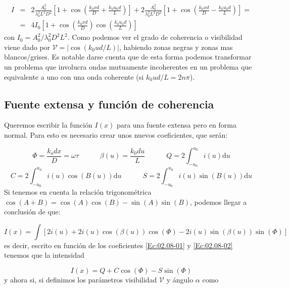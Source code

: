 \documentclass[12pt,a4paper]{book}
\numberwithin{equation}{section}
\numberwithin{figure}{section}
\newcommand{\tquad}{\quad \quad \quad}
\newcommand{\parentesis}[1]{\left( #1  \right)}
\newcommand{\ccorchetes}[1]{\left[ #1  \right]}
\newcommand{\D}{\mathrm{d}}
\newcommand{\1}{_{(1)}}
\newcommand{\2}{_{(2)}}
\theoremstyle{definition}
\begin{document}
\begin{eqnarray*}
 I  & = & 2 \frac{A_0^2}{\lambda_0^2 L^2 D^2} \ccorchetes{ 1 + \cos \parentesis{\frac{k_0 xd}{D} + \frac{k_0 u_0 d}{L}}} + 2 \frac{A_0^2}{\lambda_0^2 L^2 D^2} \ccorchetes{ 1 + \cos \parentesis{\frac{k_0 xd}{D} - \frac{k_0 u_0 d}{L}}} =  \\
 & = & 4 I_0 \ccorchetes{ 1 + \cos \parentesis{\frac{k_0 xd}{D} } \cos \parentesis{\frac{k_0 u_0 d}{L}}} 
\end{eqnarray*}
con $I_0 = A_0^2 / \lambda_0^2 D^2 L^2$. Como podemos ver el grado de coherencia o visibilidad viene dado por $\mathcal{V} = | \cos (k_0 u d / L ) |$, habiendo zonas negras y zonas mas blancos/grises. Es notable darse cuenta que de esta forma podemos transformar un problema que involucra ondas mutuamente incoherentes en un problema que equivalente a uno con una onda coherente (si $k_0 u d / L = 2n\pi$).



\hrulefill


\subsection{Fuente extensa y función de coherencia}

Queremos escribir la función $I(x)$ para una fuente extensa pero en forma normal. Para esto es necesario crear unos nuevos coeficientes, que serán:

\begin{equation}
\Phi = \frac{k_o d x }{D} = \omega \tau \tquad \beta (u) = \frac{k_0 d u }{L} \tquad Q = 2 \int_{-u_0}^{u_0} i(u) \D u  \label{Ec:02.08-01}
\end{equation}
\begin{equation}
C = 2 \int_{-u_0}^{u_0} i(u) \cos(B(u)) \D u \tquad S = 2 \int_{-u_0}^{u_0} i(u) \sin (B(u)) \D u \label{Ec:02.08-02}
\end{equation}
Si tenemos en cuenta la relación trigonométrica $\cos (A+B) = \cos (A)  \cos (B) - \sin (A) \sin (B)$, podemos llegar a conclusión de que:

$$ I(x) = \int \ccorchetes{ 2 i (u) + 2 i(u) \cos \parentesis{\beta(u)} \cos \parentesis{\Phi} - 2 i(u) \sin \parentesis{\beta(u)} \sin \parentesis{\Phi}} $$
es decir, escrito en función de los coeficientes \ref{Ec:02.08-01} y \ref{Ec:02.08-02} tenemos que la intensidad

\begin{equation}
I (x) = Q + C \cos (\Phi) - S \sin (\Phi) 
\end{equation}
y ahora si, si definimos los parámetros visibilidad $\mathcal{V}$ y ángulo $\alpha$ como
\end{document}
